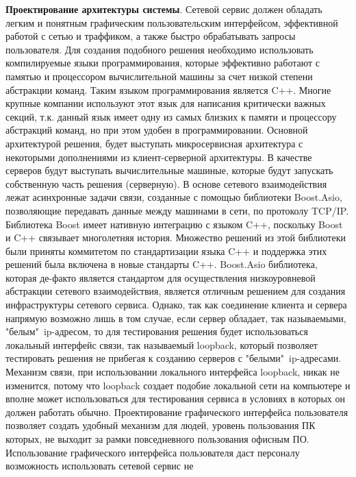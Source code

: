 \documentclass[a4paper, 14pt]{extreport}
\begin{document}
\par\textbf{Проектирование архитектуры системы}. Сетевой сервис должен обладать легким и понятным графическим пользовательским интерфейсом,
 эффективной работой с сетью и траффиком, а также быстро обрабатывать запросы пользователя. Для создания подобного решения необходимо использовать 
 компилируемые языки программирования\cite{compLangArt}\cite{compLangBook}, которые эффективно работают с памятью и
 процессором вычислительной машины за счет 
 низкой степени абстракции команд. Таким языком программирования является C++\cite{cppBook}\cite{cppArt1}. Многие крупные компании используют этот язык для написания 
 критически важных секций, т.к. данный язык имеет одну из самых близких к памяти и процессору абстракций команд, но при этом удобен в программировании. Основной архитектурой 
 решения, будет выступать микросервисная архитектура с некоторыми дополнениями из клиент-серверной архитектуры. В качестве серверов 
 будут выступать вычислительные машиные, которые будут запускать собственную часть решения (серверную). В основе сетевого
 взаимодействия лежат асинхронные задачи связи, созданные с помощью библиотеки Boost.Asio, позволяющие передавать данные между
 машинами в сети, по протоколу TCP/IP. Библиотека Boost имеет нативную интеграцию с языком C++, поскольку Boost и C++ связывает многолетняя история.
 Множество решений из этой библиотеки были приняты 
 коммитетом по стандартизации языка C++\cite{isoC++} и поддержка этих решений была включена в новые стандарты C++. Boost.Asio библиотека, которая 
 де-факто является стандартом для осуществления низкоуровневой абстракции сетевого взаимодействия, является отличным решением для создания 
 инфраструктуры сетевого сервиса. Однако, так как соединение клиента и сервера напрямую возможно лишь в том случае, если
 сервер обладает, так называемыми, "белым"\ ip-адресом, то для тестирования решения будет использоваться локальный
 интерфейс связи, так называемый loopback, который позволяет тестировать решения не прибегая к созданию серверов с "белыми"\ ip-адресами.
 Механизм связи, при использовании локального интерфейса loopback,  никак не изменится, потому что loopback создает подобие локальной сети на
  компьютере и вполне может
 использоваться для тестирования сервиса в условиях в которых он должен работать обычно. Проектирование графического интерфейса пользователя 
 позволяет создать удобный механизм для людей, уровень пользования ПК которых, не выходит за рамки повседневного пользования офисным ПО. Использование
 графического интерфейса пользователя даст
 персоналу возможность использовать сетевой сервис не 
\end{document}
